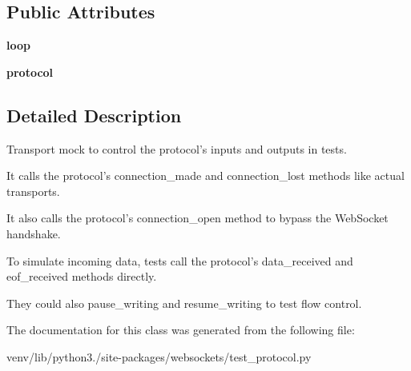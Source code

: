 \subsection*{Public Attributes}
\begin{DoxyCompactItemize}
\item 
\mbox{\label{classwebsockets_1_1test__protocol_1_1_transport_mock_accd8f17950aa543c9a8331f16f668ee4}} 
{\bfseries loop}
\item 
\mbox{\label{classwebsockets_1_1test__protocol_1_1_transport_mock_ac09016e31e74da7c45ea20e9392a19b1}} 
{\bfseries protocol}
\end{DoxyCompactItemize}


\subsection{Detailed Description}
\begin{DoxyVerb}Transport mock to control the protocol's inputs and outputs in tests.

It calls the protocol's connection_made and connection_lost methods like
actual transports.

It also calls the protocol's connection_open method to bypass the
WebSocket handshake.

To simulate incoming data, tests call the protocol's data_received and
eof_received methods directly.

They could also pause_writing and resume_writing to test flow control.\end{DoxyVerb}
 

The documentation for this class was generated from the following file\+:\begin{DoxyCompactItemize}
\item 
venv/lib/python3./site-\/packages/websockets/test\+\_\+protocol.\+py\end{DoxyCompactItemize}
